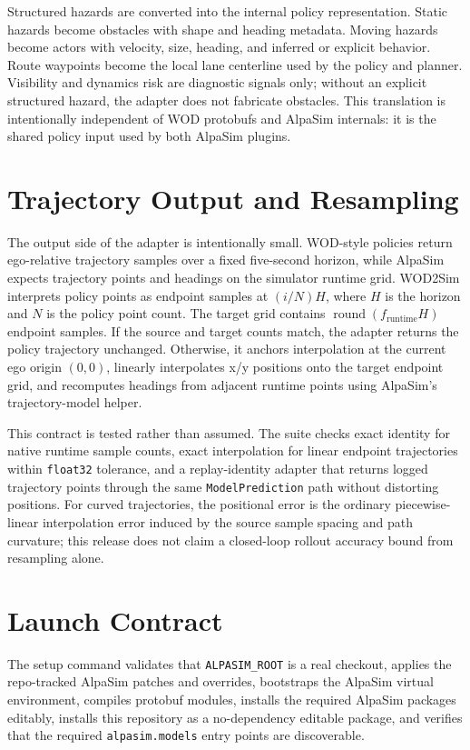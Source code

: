\documentclass{article}
\begin{document}
Structured hazards are converted into the internal policy representation. Static hazards
become obstacles with shape and heading metadata. Moving hazards become actors with
velocity, size, heading, and inferred or explicit behavior. Route waypoints become the
local lane centerline used by the policy and planner. Visibility and dynamics risk are
diagnostic signals only; without an explicit structured hazard, the adapter does not
fabricate obstacles. This translation is intentionally independent of WOD protobufs and
AlpaSim internals: it is the shared policy input used by both AlpaSim plugins.

\section{Trajectory Output and Resampling}

The output side of the adapter is intentionally small. WOD-style policies return
ego-relative trajectory samples over a fixed five-second horizon, while AlpaSim expects
trajectory points and headings on the simulator runtime grid. WOD2Sim interprets policy
points as endpoint samples at \((i/N)H\), where \(H\) is the horizon and \(N\) is the
policy point count. The target grid contains
\(\operatorname{round}(f_{\mathrm{runtime}} H)\) endpoint samples. If the source and
target counts match, the adapter returns the policy trajectory unchanged. Otherwise, it
anchors interpolation at the current ego origin \((0,0)\), linearly interpolates x/y
positions onto the target endpoint grid, and recomputes headings from adjacent runtime
points using AlpaSim's trajectory-model helper.

This contract is tested rather than assumed. The suite checks exact identity for native
runtime sample counts, exact interpolation for linear endpoint trajectories within
\texttt{float32} tolerance, and a replay-identity adapter that returns logged trajectory
points through the same \texttt{ModelPrediction} path without distorting positions.
For curved trajectories, the positional error is the ordinary piecewise-linear
interpolation error induced by the source sample spacing and path curvature; this
release does not claim a closed-loop rollout accuracy bound from resampling alone.

\section{Launch Contract}

The setup command validates that \texttt{ALPASIM\_ROOT} is a real checkout, applies the
repo-tracked AlpaSim patches and overrides, bootstraps the AlpaSim virtual environment,
compiles protobuf modules, installs the required AlpaSim packages editably, installs this
repository as a no-dependency editable package, and verifies that the required
\texttt{alpasim.models} entry points are discoverable.
\end{document}
